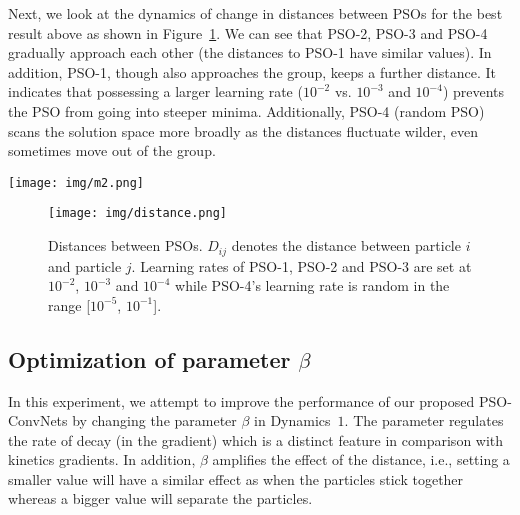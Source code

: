 \documentclass{ieeeaccess}
\begin{document}
Next, we look at the dynamics of change in distances between PSOs for the best result above as shown in Figure~\ref{fig:distance}. We can see that PSO-2, PSO-3 and PSO-4 gradually approach each other (the distances to PSO-1 have similar values). In addition, PSO-1, though also approaches the group, keeps a further distance. It indicates that possessing a larger learning rate ($10^{-2}$ vs. $10^{-3}$ and $10^{-4}$) prevents the PSO from going into steeper minima. Additionally, PSO-4 (random PSO) scans the solution space more broadly as the distances fluctuate wilder, even sometimes move out of the group.
\begin{figure*}[htb!]
\begin{center}
\texttt{[image: img/m2.png]}
\caption{Results on variation of $c_2$ and $warmup$. The weight $M$ from all particles toward wilder particles is set at a higher value. The best accuracy is recorded for all PSOs in each experiment.}
\label{fig:m2}
\end{center}
\end{figure*}
\begin{figure}[htb!]
\begin{center}
\texttt{[image: img/distance.png]}
\caption{Distances between PSOs. $D_{ij}$ denotes the distance between particle $i$ and particle $j$. Learning rates of PSO-1, PSO-2 and PSO-3 are set at $10^{-2}$, $10^{-3}$ and $10^{-4}$ while PSO-4's learning rate is random in the range [$10^{-5}$, $10^{-1}$].}
\label{fig:distance}
\end{center}
\end{figure}
\subsection{Optimization of parameter $\beta$}
\label{sec:beta}
In this experiment, we attempt to improve the performance of our proposed PSO-ConvNets by changing the parameter $\beta$ in Dynamics~$1$. The parameter regulates the rate of decay (in the gradient) which is a distinct feature in comparison with kinetics gradients. In addition, $\beta$ amplifies the effect of the distance, i.e., setting a smaller value will have a similar effect as when the particles stick together whereas a bigger value will separate the particles.
\end{document}
